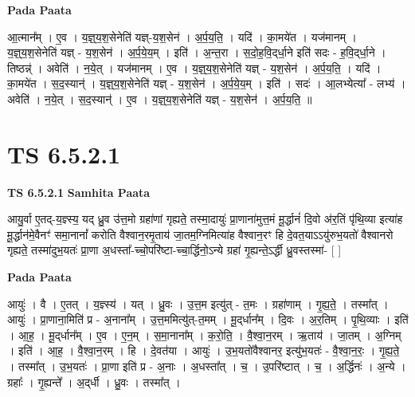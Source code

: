 \documentclass[17pt]{extarticle}
\begin{document}
\textbf{Pada Paata} \newline

आ॒त्मान᳚म् । ए॒व । य॒ज्ञ्॒य॒श॒सेनेति॑ यज्ञ्-य॒श॒सेन॑ । अ॒र्प॒य॒ति॒ । यदि॑ । का॒मये॑त । यज॑मानम् । य॒ज्ञ्॒य॒श॒सेनेति॑ यज्ञ् - य॒श॒सेन॑ । अ॒र्प॒ये॒य॒म् । इति॑ । अ॒न्त॒रा । स॒दो॒ह॒वि॒द्‌र्धा॒ने इति॑ सदः - ह॒वि॒द्‌र्धा॒ने । तिष्ठन्न्॑ । अवेति॑ । न॒ये॒त् । यज॑मानम् । ए॒व । य॒ज्ञ्॒य॒श॒सेनेति॑ यज्ञ् - य॒श॒सेन॑ । अ॒र्प॒य॒ति॒ । यदि॑ । का॒मये॑त । स॒द॒स्यान्॑ । य॒ज्ञ्॒य॒श॒सेनेति॑ यज्ञ् - य॒श॒सेन॑ । अ॒र्प॒ये॒य॒म् । इति॑ । सदः॑ । आ॒लभ्येत्या᳚ - लभ्य॑ । अवेति॑ । न॒ये॒त् । स॒द॒स्यान्॑ । ए॒व । य॒ज्ञ्॒य॒श॒सेनेति॑ यज्ञ् - य॒श॒सेन॑ । अ॒र्प॒य॒ति॒ ॥  \newline




\section*{ TS 6.5.2.1 }

\textbf{TS 6.5.2.1 } \newline
\textbf{Samhita Paata} \newline

आयु॒र्वा ए॒तद्-य॒ज्ञ्स्य॒ यद् ध्रु॒व उ॑त्त॒मो ग्रहा॑णां गृह्यते॒ तस्मा॒दायुः॑ प्रा॒णाना॑मुत्त॒मं मू॒र्द्धानं॑ दि॒वो अ॑र॒तिं पृ॑थि॒व्या इत्या॑ह मू॒र्द्धान॑मे॒वैनꣳ॑ समा॒नानां᳚ करोति वैश्वान॒रमृ॒ताय॑ जा॒तम॒ग्निमित्या॑ह वैश्वान॒रꣳ हि दे॒वत॒याऽऽयु॑रुभ॒यतो॑ वैश्वानरो गृह्यते॒ तस्मा॑दुभ॒यतः॑ प्रा॒णा अ॒धस्ता᳚-च्चो॒परि॑ष्टा-च्चा॒र्द्धिनो॒ऽन्ये ग्रहा॑ गृ॒ह्यन्ते॒ऽर्द्धी ध्रु॒वस्तस्मा॑- [  ] \newline

\textbf{Pada Paata} \newline

आयुः॑ । वै । ए॒तत् । य॒ज्ञ्स्य॑ । यत् । ध्रु॒वः । उ॒त्त॒म इत्यु॑त् - त॒मः । ग्रहा॑णाम् । गृ॒ह्य॒ते॒ । तस्मा᳚त् । आयुः॑ । प्रा॒णाना॒मिति॑ प्र - अ॒नाना᳚म् । उ॒त्त॒ममित्यु॑त्-त॒मम् । मू॒द्‌र्धान᳚म् । दि॒वः । अ॒र॒तिम् । पृ॒थि॒व्याः । इति॑ । आ॒ह॒ । मू॒द्‌र्धान᳚म् । ए॒व । ए॒न॒म् । स॒मा॒नाना᳚म् । क॒रो॒ति॒ । वै॒श्वा॒न॒रम् । ऋ॒ताय॑ । जा॒तम् । अ॒ग्निम् । इति॑ । आ॒ह॒ । वै॒श्वा॒न॒रम् । हि । दे॒वत॑या । आयुः॑ । उ॒भ॒यतो॑वैश्वानर॒ इत्यु॑भ॒यतः॑ - वै॒श्वा॒न॒रः॒ । गृ॒ह्य॒ते॒ । तस्मा᳚त् । उ॒भ॒यतः॑ । प्रा॒णा इति॑ प्र - अ॒नाः । अ॒धस्ता᳚त् । च॒ । उ॒परि॑ष्टात् । च॒ । अ॒र्द्धिनः॑ । अ॒न्ये । ग्रहाः᳚ । गृ॒ह्यन्ते᳚ । अ॒द्‌र्धी । ध्रु॒वः । तस्मा᳚त् ।  \newline
\end{document}
